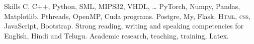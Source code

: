 
\begin{rubric}{Skills}
	C, C++, Python, SML, MIPS32, VHDL, \ldots
 \entry*[AI/ML]
        PyTorch, Numpy, Pandas, Matplotlib.
        Pthreads, OpenMP, Cuda programs.
\entry*[Databases]
	 Postgre, My, Flask.
	\textsc{Html, css}, JavaScript, Bootstrap.
\entry*[Languages]
	Strong reading, writing and speaking competencies for English, Hindi and Telugu.
\entry*[Misc.]
	Academic research, teaching, training, Latex.
\end{rubric}
